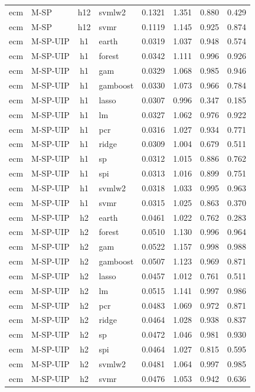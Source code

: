 \begin{ThreePartTable}
\begin{longtable}[t]{llclcccc}
ecm & M-SP & h12 & svmlw2 & 0.1321 & 1.351 & 0.880 & 0.429\\
ecm & M-SP & h12 & svmr & 0.1119 & 1.145 & 0.925 & 0.874\\
\addlinespace
ecm & M-SP-UIP & h1 & earth & 0.0319 & 1.037 & 0.948 & 0.574\\
ecm & M-SP-UIP & h1 & forest & 0.0342 & 1.111 & 0.996 & 0.926\\
ecm & M-SP-UIP & h1 & gam & 0.0329 & 1.068 & 0.985 & 0.946\\
ecm & M-SP-UIP & h1 & gamboost & 0.0330 & 1.073 & 0.966 & 0.784\\
ecm & M-SP-UIP & h1 & lasso & 0.0307 & 0.996 & 0.347 & 0.185\\
ecm & M-SP-UIP & h1 & lm & 0.0327 & 1.062 & 0.976 & 0.922\\
ecm & M-SP-UIP & h1 & pcr & 0.0316 & 1.027 & 0.934 & 0.771\\
ecm & M-SP-UIP & h1 & ridge & 0.0309 & 1.004 & 0.679 & 0.511\\
ecm & M-SP-UIP & h1 & sp & 0.0312 & 1.015 & 0.886 & 0.762\\
ecm & M-SP-UIP & h1 & spi & 0.0313 & 1.016 & 0.899 & 0.751\\
ecm & M-SP-UIP & h1 & svmlw2 & 0.0318 & 1.033 & 0.995 & 0.963\\
ecm & M-SP-UIP & h1 & svmr & 0.0315 & 1.025 & 0.863 & 0.370\\
\addlinespace
ecm & M-SP-UIP & h2 & earth & 0.0461 & 1.022 & 0.762 & 0.283\\
ecm & M-SP-UIP & h2 & forest & 0.0510 & 1.130 & 0.996 & 0.964\\
ecm & M-SP-UIP & h2 & gam & 0.0522 & 1.157 & 0.998 & 0.988\\
ecm & M-SP-UIP & h2 & gamboost & 0.0507 & 1.123 & 0.969 & 0.871\\
ecm & M-SP-UIP & h2 & lasso & 0.0457 & 1.012 & 0.761 & 0.511\\
ecm & M-SP-UIP & h2 & lm & 0.0515 & 1.141 & 0.997 & 0.986\\
ecm & M-SP-UIP & h2 & pcr & 0.0483 & 1.069 & 0.972 & 0.871\\
ecm & M-SP-UIP & h2 & ridge & 0.0464 & 1.028 & 0.938 & 0.837\\
ecm & M-SP-UIP & h2 & sp & 0.0472 & 1.046 & 0.981 & 0.930\\
ecm & M-SP-UIP & h2 & spi & 0.0464 & 1.027 & 0.815 & 0.595\\
ecm & M-SP-UIP & h2 & svmlw2 & 0.0481 & 1.064 & 0.997 & 0.985\\
ecm & M-SP-UIP & h2 & svmr & 0.0476 & 1.053 & 0.942 & 0.636\\

\end{longtable}
\end{ThreePartTable}
